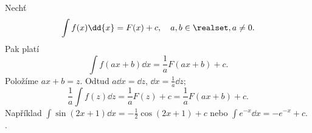 \begin{mdframed}[style=mdexam]
  \begin{example}\label{MAI:exam126} 
    Nechť
    \begin{equation*}
      \int{f(x)}\dd{x} = F(x) + c, \quad a,b\in\realset, a\neq0.
    \end{equation*}
    Pak platí
    \begin{equation}\label{mai:eq138}
      \int{f(ax + b)}\dd{x} = \frac{1}{a}F(ax + b) + c.
    \end{equation}
    Položíme \(ax + b =z\). Odtud \(a\dd{x} = \dd{z}\), \(\dd{x} = \frac{1}{a}\dd{z}\); 
    \begin{equation*}
      \boxed{\frac{1}{a}\int{f(z)}\dd{z} = \frac{1}{a}F(z) + c = \frac{1}{a}F(ax+b) + c.}
    \end{equation*}
    Například \(\int{\sin(2x+1)}\dd{x} = -\frac{1}{2}\cos(2x + 1) + c\) nebo \(\int{e^{-x}}\dd{x} =
    -e^{-x} + c\). \cite[s.~261]{Brabec1989}. 
  \end{example}
\end{mdframed}